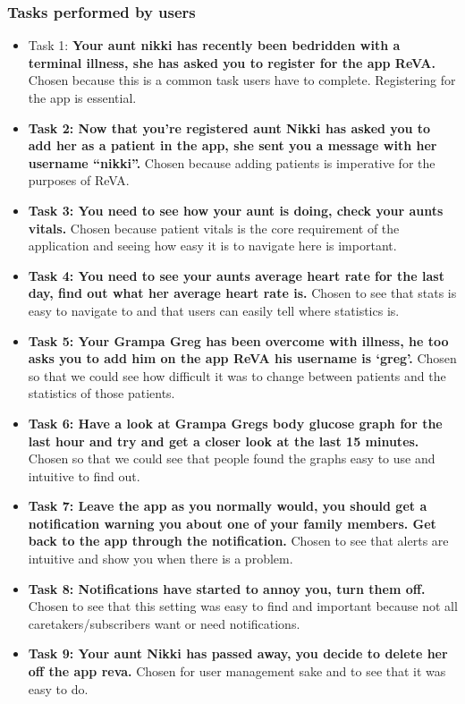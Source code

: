 \documentclass[12pt]{article}
\begin{document}
{\subsubsection{Tasks performed by users} 
\begin{itemize}
	\item Task 1: \textbf{Your aunt nikki has recently been bedridden with a terminal illness, she has asked you to register for the app ReVA.} Chosen because this is a common task users have to complete. Registering for the app is essential.
\item \textbf{Task 2: Now that you’re registered aunt Nikki has asked you to add her as a patient in the app, she sent you a message with her username “nikki”.} Chosen because adding patients is imperative for the purposes of ReVA. 
\item \textbf{Task 3: You need to see how your aunt is doing, check your aunts vitals.} Chosen because patient vitals is the core requirement of the application and seeing how easy it is to navigate here is important. 
\item \textbf{Task 4: You need to see your aunts average heart rate for the last day, find out what her average heart rate is.} Chosen to see that stats is easy to navigate to and that users can easily tell where statistics is. 
\item \textbf{Task 5: Your Grampa Greg has been overcome with illness, he too asks you to add him on the app ReVA his username is ‘greg’.} Chosen so that we could see how difficult it was to change between patients and the statistics of those patients. 
\item \textbf{Task 6: Have a look at Grampa Gregs body glucose graph for the last hour and try and get a closer look at the last 15 minutes.} Chosen so that we could see that people found the graphs easy to use and intuitive to find out. 
\item \textbf{Task 7: Leave the app as you normally would, you should get a notification warning you about one of your family members. Get back to the app through the notification.} Chosen to see that alerts are intuitive and show you when there is a problem. 
\item \textbf{Task 8: Notifications have started to annoy you, turn them off.} Chosen to see that this setting was easy to find and important because not all caretakers/subscribers want or need notifications. 
\item \textbf{Task 9: Your aunt Nikki has passed away, you decide to delete her off the app reva.} Chosen for user management sake and to see that it was easy to do. 
\end{itemize}

}
\end{document}
